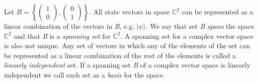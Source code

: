 Let $B=\left\{
	\begin{pmatrix}
		1\\
		0
	\end{pmatrix},
	\begin{pmatrix}
		0\\
		1
	\end{pmatrix}
\right\}$. All state vectors in space $\mathbb{C}^2$ can be represented as a linear combination of the vectors in \textit{B}, e.g. $\vert \psi \rangle$. We say that set \textit{B} \textit{spans} the space $\mathbb{C}^2$ and that \textit{B} is a \textit{spanning set} for $\mathbb{C}^2$. A spanning set for a complex vector space is also not unique. Any set of vectors in which any of the elements of the set can be represented as a linear combination of the rest of the elements is called a \textit{linearly independent} set. If a spanning set \textit{B} of a complex vector space is linearly independent we call such set as a \textit{basis} for the space.

